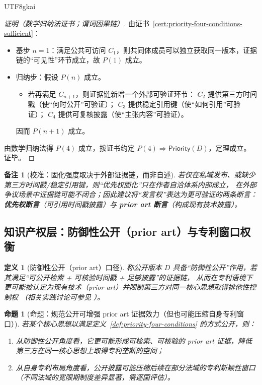 \documentclass[12pt]{article}
\newtheorem{definition}{定义}[section]
\newtheorem{proposition}{命题}[section]
\newtheorem{remark}{备注}[section]
\begin{document}
\begin{CJK*}{UTF8}{gkai}
\begin{proof}[证明（数学归纳法证书；谓词因果链）]
由证书~\ref{cert:priority-four-conditions-sufficient}：
\begin{itemize}
  \item 基步 $n=1$：满足公共可访问 $C_1$，则共同体成员可以独立获取同一版本，证据链的“可见性”环节成立，故 $P(1)$ 成立。
  \item 归纳步：假设 $P(n)$ 成立。
  \begin{itemize}
    \item 若再满足 $C_{n+1}$，则证据链新增一个外部可验证环节：
    $C_2$ 提供第三方时间戳（使“何时公开”可验证）；
    $C_3$ 提供稳定引用键（使“如何引用”可验证）；
    $C_4$ 提供可复核披露（使“主张内容”可验证）。
  \end{itemize}
  因而 $P(n+1)$ 成立。
\end{itemize}
由数学归纳法得 $P(4)$ 成立，按证书约定 $P(4)\Rightarrow \mathsf{Priority}(D)$，定理成立。证毕。
\end{proof}

\begin{remark}[校准：固化强度取决于外部证据链，而非自述]
若仅在私域发布、或缺少第三方时间戳/稳定引用键，则“优先权固化”只在作者自洽体系内部成立，
在外部争议场景中证据链可能不闭合；因此建议将“发言权”表达为更可验证的两条断言：
\textbf{优先权断言}（可引用时间戳披露）与 \textbf{prior art 断言}（构成现有技术披露）。
\end{remark}

\subsection{知识产权层：防御性公开（prior art）与专利窗口权衡}
\label{sec:priority-ip}

\begin{definition}[防御性公开（prior art）口径]
\label{def:defensive-publication}
称公开版本 $D$ 具备“防御性公开”作用，若其满足“可公开检索 + 可核验时间戳 + 足够披露”的证据链，
从而在专利语境下更可能被认定为现有技术（prior art）并限制第三方对同一核心思想取得排他性控制权
（相关实践讨论可参见 \cite{ref_perkinscoie_prior_art}）。
\end{definition}

\begin{proposition}[命题：规范公开可增强 prior art 证据效力（但也可能压缩自身专利窗口）]
\label{prop:prior-art-and-window-tradeoff}
若某个核心思想以满足定义~\ref{def:priority-four-conditions} 的方式公开，则：
\begin{enumerate}
  \item 从防御性公开角度看，它更可能形成可检索、可核验的 prior art 证据，降低第三方在同一核心思想上取得专利垄断的空间；
  \item 从自身专利布局角度看，公开披露可能压缩后续在部分法域的专利新颖性窗口（不同法域的宽限期制度差异显著，需逐国评估）。
\end{enumerate}
\end{proposition}


\end{CJK*}
\end{document}
